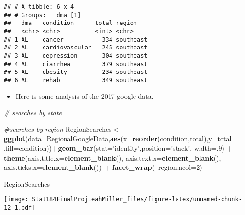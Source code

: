 \documentclass[]{article}
\newenvironment{Shaded}{\begin{snugshade}}{\end{snugshade}}
\newcommand{\CommentTok}[1]{\textcolor[rgb]{0.56,0.35,0.01}{\textit{#1}}}
\newcommand{\DataTypeTok}[1]{\textcolor[rgb]{0.13,0.29,0.53}{#1}}
\newcommand{\DecValTok}[1]{\textcolor[rgb]{0.00,0.00,0.81}{#1}}
\newcommand{\KeywordTok}[1]{\textcolor[rgb]{0.13,0.29,0.53}{\textbf{#1}}}
\newcommand{\NormalTok}[1]{#1}
\newcommand{\OperatorTok}[1]{\textcolor[rgb]{0.81,0.36,0.00}{\textbf{#1}}}
\newcommand{\StringTok}[1]{\textcolor[rgb]{0.31,0.60,0.02}{#1}}
\providecommand{\tightlist}{%
  \setlength{\itemsep}{0pt}\setlength{\parskip}{0pt}}
\begin{document}
\begin{Shaded}
\begin{Highlighting}[]
{{{{{{{\NormalTok{RegionalGoogleData <-}\StringTok{ }\KeywordTok{na.omit}\NormalTok{(RegionalGoogleData)}
\KeywordTok{head}\NormalTok{(RegionalGoogleData)}
\end{Highlighting}
\end{Shaded}

\begin{verbatim}
## # A tibble: 6 x 4
## # Groups:   dma [1]
##   dma   condition      total region   
##   <chr> <chr>          <int> <chr>    
## 1 AL    cancer           334 southeast
## 2 AL    cardiovascular   245 southeast
## 3 AL    depression       304 southeast
## 4 AL    diarrhea         379 southeast
## 5 AL    obesity          234 southeast
## 6 AL    rehab            349 southeast
\end{verbatim}

\begin{itemize}
\tightlist
\item
  Here is some analysis of the 2017 google data.
\end{itemize}

\begin{Shaded}
\begin{Highlighting}[]
\CommentTok{# searches by state}



\CommentTok{#searches by region}
\NormalTok{RegionSearches <-}
\StringTok{  }\KeywordTok{ggplot}\NormalTok{(}\DataTypeTok{data=}\NormalTok{RegionalGoogleData,}\KeywordTok{aes}\NormalTok{(}\DataTypeTok{x=}\KeywordTok{reorder}\NormalTok{(condition,total),}\DataTypeTok{y=}\NormalTok{total ,}\DataTypeTok{fill=}\NormalTok{condition))}\OperatorTok{+}\KeywordTok{geom_bar}\NormalTok{(}\DataTypeTok{stat=}\StringTok{'identity'}\NormalTok{,}\DataTypeTok{position=}\StringTok{'stack'}\NormalTok{, }\DataTypeTok{width=}\NormalTok{.}\DecValTok{9}\NormalTok{) }\OperatorTok{+}\StringTok{ }\KeywordTok{theme}\NormalTok{(}\DataTypeTok{axis.title.x=}\KeywordTok{element_blank}\NormalTok{(),}
        \DataTypeTok{axis.text.x=}\KeywordTok{element_blank}\NormalTok{(),}
        \DataTypeTok{axis.ticks.x=}\KeywordTok{element_blank}\NormalTok{()) }\OperatorTok{+}\StringTok{ }\KeywordTok{facet_wrap}\NormalTok{(}\OperatorTok{~}\NormalTok{region,}\DataTypeTok{ncol=}\DecValTok{2}\NormalTok{) }

\NormalTok{RegionSearches}
\end{Highlighting}
\end{Shaded}

\texttt{[image: Stat184FinalProjLeahMiller\_files/figure-latex/unnamed-chunk-12-1.pdf]}
\end{document}
